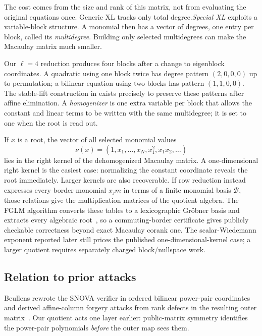 \documentclass[11pt]{article}
\newcommand{\SNOVA}{\textsf{SNOVA}}
\begin{document}
The cost comes from the size and rank of this matrix, not from evaluating the
original equations once.  Generic XL tracks only total degree.\@  \emph{Special
XL} exploits a variable-block structure.  A monomial then has a vector of
degrees, one entry per block, called its \emph{multidegree}.  Building only
selected multidegrees can make the Macaulay matrix much smaller.

Our $\ell=4$ reduction produces four blocks after a change to eigenblock
coordinates.  A quadratic using one block twice has degree pattern
$(2,0,0,0)$ up to permutation; a bilinear equation using two blocks has pattern
$(1,1,0,0)$.  The stable-lift construction in
 exists precisely to preserve these patterns after
affine elimination.  A \emph{homogenizer} is one extra variable per block that
allows the constant and linear terms to be written with the same
multidegree; it is set to one when the root is read out.

If $x$ is a root, the vector of all selected monomial values
\[
  \nu(x)=(1,x_1,\ldots,x_N,x_1^2,x_1x_2,\ldots)
\]
lies in the right kernel of the dehomogenized Macaulay matrix.  A
one-dimensional right kernel is the easiest case: normalizing the constant
coordinate reveals the root immediately.  Larger kernels are also recoverable.
If row reduction instead expresses every border monomial $x_jm$ in terms of a
finite monomial basis $\mathcal B$, those relations give the multiplication
matrices of the quotient algebra.  The FGLM algorithm converts these tables to
a lexicographic Gr\"obner basis and extracts every algebraic
root~\cite{FaugereEtAl1993FGLM}, so a commuting-border certificate gives
publicly checkable correctness beyond exact Macaulay corank one.  The scalar-Wiedemann exponent reported later
still prices the published one-dimensional-kernel case; a larger quotient
requires separately charged block/nullspace work.

\subsection{Relation to prior attacks}\label{sec:related}

Beullens rewrote the \SNOVA{} verifier in ordered bilinear power-pair
coordinates and derived affine-column forgery attacks from rank defects in the
resulting outer matrix~\cite{Beullens2024SNOVA}.  Our quotient acts one layer
earlier: public-matrix symmetry identifies the power-pair polynomials
\emph{before} the outer map sees them.
\end{document}
